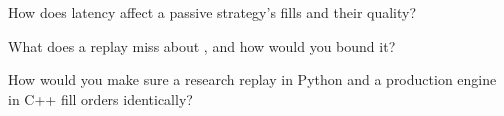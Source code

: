 \begin{interviewq}\label{iq:rs:order-book-replay-simulation:4}
How does latency affect a passive strategy's fills and their quality?
\end{interviewq}

\begin{interviewq}\label{iq:rs:order-book-replay-simulation:5}
What does a replay  miss about , and how would you bound it?
\end{interviewq}

\begin{interviewq}\label{iq:rs:order-book-replay-simulation:6}
How would you make sure a research replay in Python and a production engine in C++ fill orders identically?
\end{interviewq}
